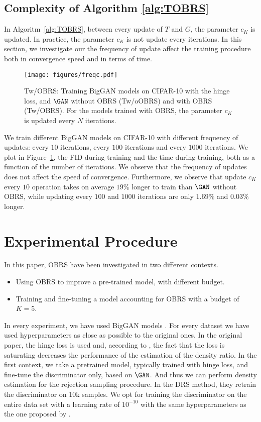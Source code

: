 \documentclass[twoside]{article}
\begin{document}
\subsection{Complexity of Algorithm \ref{alg:TOBRS}}\label{app:subsec:complexity}
In Algoritm~\ref{alg:TOBRS}, between every update of $T$ and $G$, the parameter $c_K$ is updated. In practice, the parameter $c_K$ is not update every iterations. In this section, we investigate our the frequency of update affect the training procedure both in convergence speed and in terms of time.

\begin{figure}[H]
    \centering
    \texttt{[image: figures/freqc.pdf]}
    \caption{Tw/OBRS: Training BigGAN models on CIFAR-10 with the hinge loss, and $\GAN$ without OBRS (Tw/oOBRS) and with OBRS (Tw/OBRS). For the models trained with OBRS, the parameter $c_K$ is updated every $N$ iterations. }
    \label{app:fig:freqc}
\end{figure}

We train different BigGAN models on CIFAR-10 with different frequency of updates: every $10$ iterations, every $100$ iterations and every $1000$ iterations. We plot in Figure~\ref{app:fig:freqc}, the FID during training and the time during training, both as a function of the number of iterations. We observe that the frequency of updates does not affect the speed of convergence. Furthermore, we observe that update $c_K$ every $10$ operation takes on average $19\%$ longer to train than $\GAN$ without OBRS, while updating every $100$ and $1000$ iterations are only $1.69\%$ and $0.03\%$ longer.    


\section{Experimental Procedure}
In this paper, OBRS have been investigated in two different contexts.
\begin{itemize}
    \item Using OBRS to improve a pre-trained model, with different budget.
    \item Training and fine-tuning a model accounting for OBRS with a budget of $K=5$.
\end{itemize}

In every experiment, we have used BigGAN models \cite{brock_large_2019}. For every dataset we have used hyperparameters as close as possible to the original ones. In the original paper, the hinge loss is used and, according to \cite{azadi_discriminator_2019}, the fact that the loss is saturating decreases the performance of the estimation of the density ratio. In the first context, we take a pretrained model, typically trained with hinge loss, and fine-tune the discriminator only, based on $\GAN$. And thus we can perform density estimation for the rejection sampling procedure. In the DRS method, they retrain the discriminator on 10k samples. We opt for training the discriminator on the entire data set with a learning rate of $10^{-10}$ with the same hyperparameters as the one proposed by \cite{brock_large_2019}.
\end{document}
